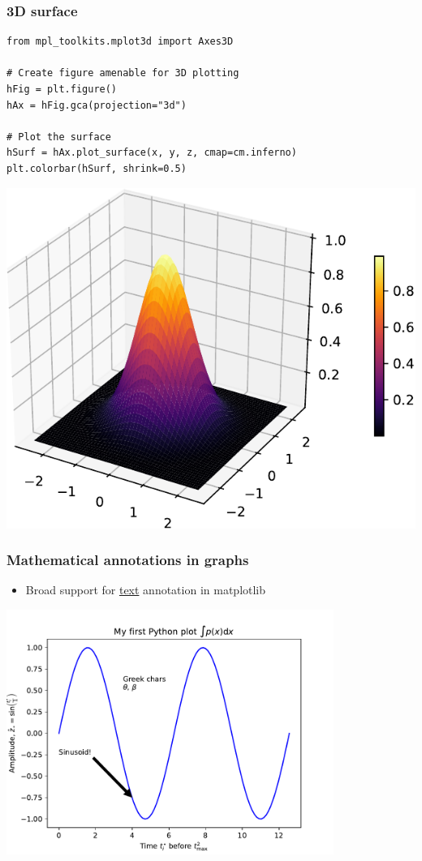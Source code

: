 \documentclass[xcolor=table]{beamer}
\begin{document}
\begin{frame}[fragile]
\frametitle{3D surface}

\tiny
\begin{lstlisting}[style=python]
from mpl_toolkits.mplot3d import Axes3D

# Create figure amenable for 3D plotting
hFig = plt.figure()
hAx = hFig.gca(projection="3d")

# Plot the surface
hSurf = hAx.plot_surface(x, y, z, cmap=cm.inferno)
plt.colorbar(hSurf, shrink=0.5)
\end{lstlisting}

\vspace{-0.8cm}
\begin{center}
	\includegraphics[width=.42\textwidth]{plot6.pdf}
\end{center}

\end{frame}

\begin{frame}[fragile]
\frametitle{Mathematical annotations in graphs}
    \begin{itemize}
        \item Broad support for \href{https://matplotlib.org/users/text_intro.html}{text} annotation in matplotlib
    \end{itemize}
\begin{center}
	\includegraphics[width=0.8\textwidth]{plot_text_annotate.pdf}
\end{center}
\end{frame}
            
\end{document}
